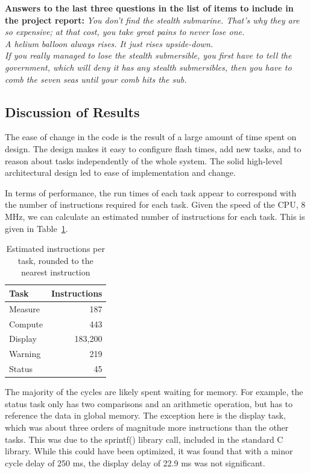 \documentclass[12pt]{article} %
\begin{document}
\textbf{Answers to the last three questions in the list of items to include in the project report:}
\emph{You don't find the stealth submarine. That's why they are so expensive; at that cost, you take great pains to never lose one.\\
A helium balloon always rises. It just rises upside-down. \\
If you really managed to lose the stealth submersible, you first have to tell the government, which will deny it has any stealth submersibles, then you have to comb the seven seas until your comb hits the sub.}
 
\subsection{Discussion of Results}
The ease of change in the code is the result of a large amount of time spent on
design.  The design makes it easy to configure flash times, add new tasks, and
to reason about tasks independently of the whole system.  The solid high-level
architectural design led to ease of implementation and change.

In terms of performance, the run times of each task appear to correspond with
the number of instructions required for each task.  Given the speed of the CPU,
8 MHz, we can calculate an estimated number of instructions for each task.
This is given in Table~\ref{tab:instr}.
\begin{table}[h]
	\centering
	\begin{tabular}{|l|r|} 
		\hline
		Task & Instructions \\ \hline
		Measure & 187 \\ \hline
		Compute & 443 \\ \hline
		Display & 183,200 \\ \hline
		Warning & 219	\\ \hline
		Status & 45	\\ \hline
	\end{tabular}
	\caption{Estimated instructions per task, rounded to the nearest instruction}
  \label{tab:instr}
\end{table}
The majority of the cycles are likely spent waiting for memory.  For example,
the status task only has two comparisons and an arithmetic operation, but has
to reference the data in global memory.  The exception here is the display
task, which was about three orders of magnitude more instructions than the
other tasks.  This was due to the sprintf() library call, included in the
standard C library.  While this could have been optimized, it was found that
with a minor cycle delay of 250 ms, the display delay of 22.9 ms was not
significant.
\end{document}
